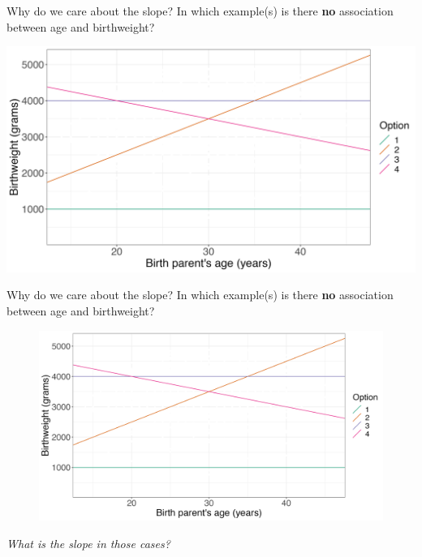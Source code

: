 \documentclass[10pt,t]{beamer}
\begin{document}
\begin{frame}{Why do we care about the slope?}
In which example(s) is there \textbf{no} association between age and birthweight?

\vspace{0.3cm}

\centering \includegraphics[scale=0.35]{zeroslopes.png}

\end{frame}

\begin{frame}{Why do we care about the slope?}
In which example(s) is there \textbf{no} association between age and birthweight?

\vspace{0.3cm}

\begin{figure}
\centering \includegraphics[scale=0.35]{zeroslopes.png}
\end{figure}

\vspace{0.3cm}

\textit{What is the slope in those cases?}

\end{frame}
\end{document}
